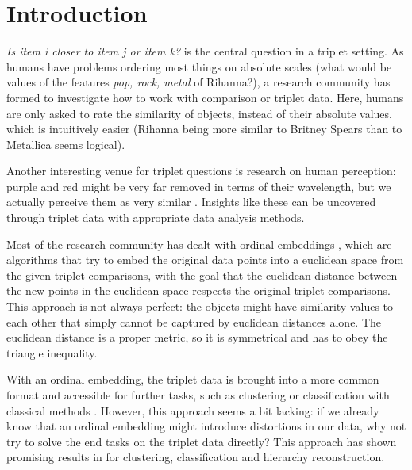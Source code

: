 \chapter{Introduction}\label{Introduction}
\textit{Is item i closer to item j or item k?} is the central question in a triplet setting. As humans have problems ordering 
most things on absolute scales (what would be values of the features \textit{pop, rock, metal} of Rihanna?), a research community has formed
to investigate how to work with comparison or triplet data. Here, humans are only asked to rate the similarity of objects, instead
of their absolute values, which is intuitively easier (Rihanna being more similar to Britney Spears than to Metallica seems logical). 

Another interesting venue for triplet questions is research on human perception: purple and red might be very far removed in terms of their wavelength,
but we actually perceive them as very similar \citep{shepardAnalysisProximitiesMultidimensional1962}. Insights like these can be uncovered through triplet data 
with appropriate data analysis methods. 

Most of the research community has dealt with ordinal embeddings \citep{agarwalGeneralizedNonmetricMultidimensional2007, tamuzAdaptivelyLearningCrowd2011,
laurensvandermaatenStochasticTripletEmbedding2012,   teradaLocalOrdinalEmbedding2014, jainFiniteSamplePrediction2016, ghoshLandmarkOrdinalEmbedding2019, andertonScalingOrdinalEmbedding2019}, which 
are algorithms that try to embed the original data points into a euclidean space from the given triplet comparisons, with the goal that the euclidean distance between the new points
in the euclidean space respects the original triplet comparisons. 
This approach is not always perfect: the objects might have similarity values to each other that simply cannot be captured by euclidean distances alone. 
The euclidean distance is a proper metric, so it is symmetrical and has to obey the triangle inequality. 

With an ordinal embedding, the triplet data is brought into a more common format and accessible for further tasks, such as clustering or classification with classical methods \citep{kleindessnerLensDepthFunction2017}. However, this approach seems a bit lacking: if we already know that an ordinal embedding might introduce distortions in our data, why not try to solve the end tasks on
the triplet data directly? This approach has shown promising results in 
\citep{kleindessnerLensDepthFunction2017, kleindessnerKernelFunctionsBased2017, ghoshdastidarFoundationsComparisonBasedHierarchical2019} for clustering, classification and hierarchy reconstruction. 

